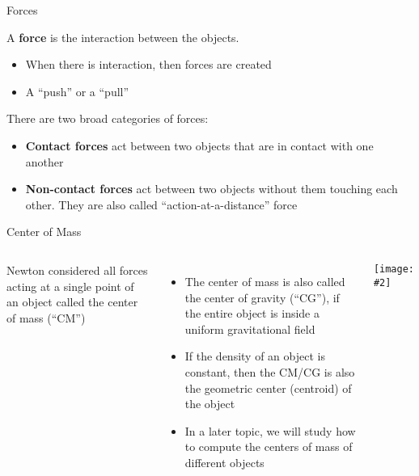 \documentclass[12pt,compress,aspectratio=169]{beamer}
\newcommand{\pic}[2]{\texttt{[image: \#2]}}
\begin{document}
\begin{frame}{Forces}

  A \textbf{force} is the interaction between the objects.
  \begin{itemize}
  \item When there is interaction, then forces are created
  \item A ``push'' or a ``pull''
  \end{itemize}

  There are two broad categories of forces:
  \begin{itemize}
  \item\textbf{Contact forces} act between two objects that are in contact
    with one another
  \item\textbf{Non-contact forces} act between two objects without them
    touching each other. They are also called ``action-at-a-distance'' force
  \end{itemize}
\end{frame}



\begin{frame}{Center of Mass}
  \vspace{.2in}
  \begin{columns}
    Newton considered all forces acting at a single point of an object called
    the center of mass (``CM'')
    \begin{itemize}
    \item The center of mass is also called the center of gravity (``CG''), if
      the entire object is inside a uniform gravitational field
    \item If the density of an object is constant, then the CM/CG is also the
      geometric center (centroid) of the object
    \item In a later topic, we will study how to compute the centers of mass of
      different objects
    \end{itemize}

    \pic{1}{graphics/cofm.png}
  \end{columns}
\end{frame}
\end{document}

